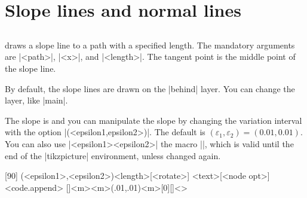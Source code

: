 \section{Slope lines and normal lines}
\label{s:slopes}

\subsection{\protect\cmd{\tzslopeat}}
\label{ss:tzslopeat}

\icmd{\tzslopeat} draws a slope line to a path with a specified length.
The mandatory arguments are |{<path>}|, |{<x>}|, and |{<length>}|.
The tangent point is the middle point of the slope line.

By default, the slope lines are drawn on the |behind| layer.
You can change the layer, like \icmd{\settztslopelayer}|{main}|.

\remark The slope is  and you can manipulate the slope by changing the variation interval with the option |(<epsilon1,epsilon2>)|. The default is $(\varepsilon_1,\varepsilon_2)=(0.01,0.01)$.
You can also use
\icmd{\settzslopeepsilon}|{<epsilon1>}{<epsilon2>}|  the macro |\tzslopeat|, which is valid until the end of the |tikzpicture| environment, unless changed again.


\begin{tzdef}
[90]  %
(<epsilon1>,<epsilon2>){<length>}[<rotate>]
          {<text>}[<node opt>]<code.append>
  []{<m>}{<m>}(.01,.01){<m>}[0]{}[]<>
\end{tzdef}

\begin{tzcode}{.3}
{}
\end{tzcode}


\begin{tzcode}{.3}
\end{tzcode}




